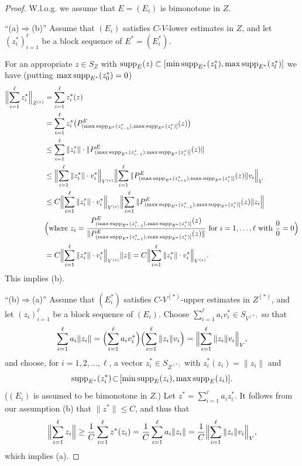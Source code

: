 \documentclass[11pt,leqno]{amsart}
\theoremstyle{definition}
\newcommand{\supp}{{\rm supp}}
\newcommand{\Zs}{Z^{(*)}}
\newcommand{\Vs}{V^{(*)}}
\begin{document}
\begin{proof} W.l.o.g. we assume that $E=(E_i)$ is bimonotone in $Z$.

\noindent``(a)$\Rightarrow$(b)'' Assume that $(E_i)$ satisfies $C$-$V$-lower
 estimates in $Z$, and let  $(z_i^*)_{i=1}^\ell$ be a block sequence of
 $E^*=(E_i^*)$.

 For an appropriate $z\in S_Z$
 with $\supp_E(z)\subset
 [\min\supp_{E^*}(z_1^*),\max\supp_{E^*}(z_l^*)]$ we have (putting
 $\max\supp_{E^*}(z_{0}^*)=0$)
\begin{align*}
\Bigl\|\sum_{i=1}^\ell z_i^*\Bigr\|_{Z^{(*)}}
&=\sum_{i=1}^\ell z_i^*(z)\\
&= \sum_{i=1}^\ell z_i^*
   \big(P^E_{(\max\supp_{E^*}(z_{i-1}^*),\max\supp_{E^*}(z_{i}^*)]}(z)\big)\\
&\leq \sum_{i=1}^\ell \|z_i^*\|\cdot
 \|P^E_{(\max\supp_{E^*}(z_{i-1}^*),\max\supp_{E^*}(z_{i}^*)]}(z)\|\\
&\leq\Bigl\|\sum_{i=1}^\ell \|z_i^*\|  \cdot v_i^*\Bigr\|_{\Vs}
  \Bigl\|\sum_{i=1}^\ell  \|P^E_{(\max\supp_{E^*}(z_{i-1}^*), \max\supp_{E^*}(z_{i}^*)]}(z)
 \| v_i\Bigr\|_{V} \\
&\leq C\Bigl\|\sum_{i=1}^\ell \|z_i^*\|  \cdot v_i^*\Bigr\|_{\Vs}
  \Bigl\|\sum_{i=1}^\ell  \|P^E_{(\max\supp_{E^*}(z_{i-1}^*), \max\supp_{E^*}(z_{i}^*)]}(z)  \|
 z_i\Bigr\| \\
&\text{\Big(where }
 z_i=\frac{P^E_{(\max\supp_{E^*}(z_{i-1}^*), \max\supp_{E^*}(z_{i}^*)]}
         (z)}{\|P^E_{(\max\supp_{E^*}(z_{i-1}^*), \max\supp_{E^*}(z_{i}^*)]}(z)  \|}
        \text{ for $i=1,\ldots,\ell$} \text{ with }\frac00=0\Big)\\
&= C\Bigl\|\sum_{i=1}^\ell \|z_i^*\| \cdot v_i^*\Bigr\|_{\Vs}  \|z\|
= C\Bigl\|\sum_{i=1}^\ell \|z_i^*\| \cdot v_i^*\Bigr\|_{\Vs}.
\end{align*}
This implies (b).

\noindent``(b)$\Rightarrow$(a)'' Assume that $(E_i^*)$ satisfies $C$-$\Vs$-upper
 estimates in $\Zs$, and let  $(z_i)_{i=1}^\ell$ be a block sequence of
 $(E_i)$.
Choose $\sum_{i=1}^\ell a_i v_i^*\in S_{\Vs}$ so that
 $$\sum_{i=1}^\ell a_i\|z_i\|=
 \Bigl(\sum_{i=1}^\ell a_iv^*_i\Bigr)\Bigl(\sum_{i=1}^\ell \|z_i\| v_i\Bigr)=
                                                   \Bigl\|\sum_{i=1}^\ell \|z_i\|
                   v_i\Bigr\|_V,$$
and choose, for $i=1,2,\ldots,\ell$, a vector $z_i^*\!\in\! S_{\Zs}$ with
  $z_i^*(z_i)=\|z_i\|$ and
 $$\supp_{E^*} (z_i^*)\!\subset\![\min\supp_E (z_i), \max\supp_E (z_i)].$$
 ($(E_i)$ is assumed to be bimonotone in $Z$.) Let $z^*=\sum_{i=1}^\ell a_i z_i^*$. It
 follows from our assumption (b) that $\|z^*\|\le C$, and thus that
$$\Bigl\|\sum_{i=1}^\ell z_i\Bigr \|\ge    \frac1C \sum_{i=1}^\ell z^*(z_i)=
 \frac1C \sum_{i=1}^\ell a_i\|z_i\|=\frac1C \Bigl\|\sum_{i=1}^\ell \|z_i\| v_i\Bigr\|_V,$$
which implies (a).
\end{proof}
\end{document}

